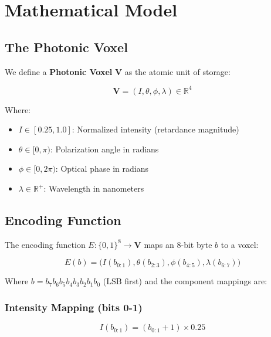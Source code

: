 \documentclass[11pt,a4paper]{article}
\begin{document}
\section{Mathematical Model}

\subsection{The Photonic Voxel}

We define a \textbf{Photonic Voxel} $\mathbf{V}$ as the atomic unit of storage:

\begin{equation}
    \mathbf{V} = (I, \theta, \phi, \lambda) \in \mathbb{R}^4
\end{equation}

Where:
\begin{itemize}
    \item $I \in [0.25, 1.0]$: Normalized intensity (retardance magnitude)
    \item $\theta \in [0, \pi)$: Polarization angle in radians
    \item $\phi \in [0, 2\pi)$: Optical phase in radians
    \item $\lambda \in \mathbb{R}^+$: Wavelength in nanometers
\end{itemize}

\subsection{Encoding Function}

The encoding function $E: \{0,1\}^8 \rightarrow \mathbf{V}$ maps an 8-bit byte $b$ to a voxel:

\begin{equation}
    E(b) = \Big( I(b_{0:1}), \theta(b_{2:3}), \phi(b_{4:5}), \lambda(b_{6:7}) \Big)
\end{equation}

Where $b = b_7 b_6 b_5 b_4 b_3 b_2 b_1 b_0$ (LSB first) and the component mappings are:

\subsubsection{Intensity Mapping (bits 0-1)}

\begin{equation}
    I(b_{0:1}) = (b_{0:1} + 1) \times 0.25
\end{equation}
\end{document}
